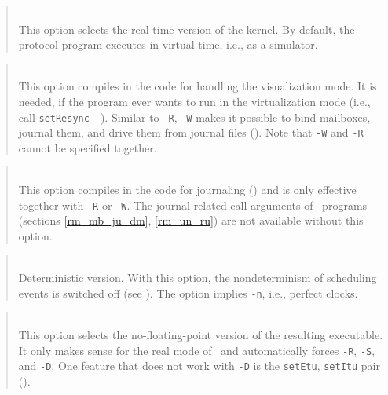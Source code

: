 \begin{quote}
\noindent{}\\ \hspace{0in}
This option selects the real-time version of the kernel.
By default, the protocol program executes in virtual time, i.e., as a
simulator.
\end{quote}

\begin{quote}
\noindent{}\\ \hspace{0in}
This option compiles in the code for handling the visualization mode.
It is needed, if the program ever wants to run in the virtualization mode
(i.e., call {\tt setResync}---).
Similar to {\tt -R}, {\tt -W} makes it possible to bind mailboxes, journal
them, and drive them from journal files ().
Note that {\tt -W} and {\tt -R} cannot be specified together.
\end{quote}

\begin{quote}
\noindent{}\\ \hspace{0in}
This option compiles in the code for journaling () and is
only effective together with {\tt -R} or {\tt -W}.
The journal-related call arguments of \smurph\ programs (sections
\ref{rm_mb_ju_dm}, \ref{rm_un_ru}) are not available without this option.
\end{quote}

\begin{quote}
\noindent{}\\ \hspace{0in}
Deterministic version.
With this option, the nondeterminism of scheduling events is switched off
(see ).
The option implies {\tt -n}, i.e., perfect clocks.
\end{quote}\medskip

\begin{quote}
\noindent{}\\ \hspace{0in}
This option selects the no-floating-point version of the resulting
executable.
It only makes sense for the real mode of \smurph\ and automatically
forces {\tt -R}, {\tt -S}, and {\tt -D}.
One feature that does not work with {\tt -D} is the {\tt setEtu},
{\tt setItu} pair ().
\end{quote}\medskip

